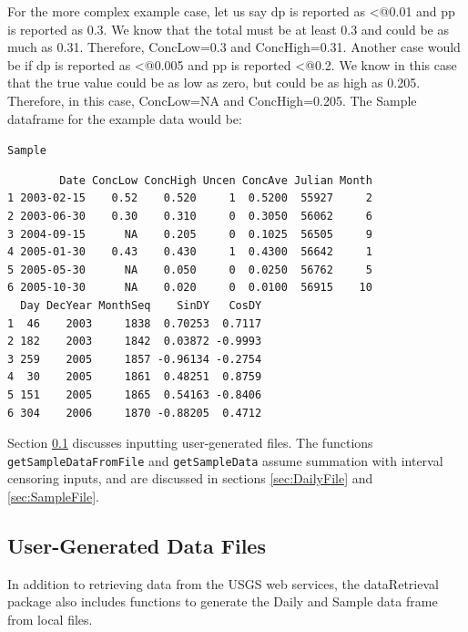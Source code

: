 \documentclass[a4paper,11pt]{article}\usepackage[]{graphicx}\usepackage[]{color}
\makeatletter
\newcommand{\hlstd}[1]{\textcolor[rgb]{0.345,0.345,0.345}{#1}}%
\newenvironment{kframe}{%
 \def\at@end@of@kframe{}%
 \ifinner\ifhmode%
  \def\at@end@of@kframe{\end{minipage}}%
  \begin{minipage}{\columnwidth}%
 \fi\fi%
 \def\FrameCommand##1{\hskip\@totalleftmargin \hskip-\fboxsep
 \colorbox{shadecolor}{##1}\hskip-\fboxsep
     \hskip-\linewidth \hskip-\@totalleftmargin \hskip\columnwidth}%
 \MakeFramed {\advance\hsize-\width
   \@totalleftmargin\z@ \linewidth\hsize
   \@setminipage}}%
 {\par\unskip\endMakeFramed%
 \at@end@of@kframe}
\newenvironment{knitrout}{}{} %
\makeatother
\begin{document}
For the more complex example case, let us say dp is reported as \verb@<@0.01 and pp is reported as 0.3. We know that the total must be at least 0.3 and could be as much as 0.31. Therefore, ConcLow=0.3 and ConcHigh=0.31. Another case would be if dp is reported as \verb@<@0.005 and pp is reported \verb@<@0.2. We know in this case that the true value could be as low as zero, but could be as high as 0.205. Therefore, in this case, ConcLow=NA and ConcHigh=0.205. The Sample dataframe for the example data would be:



\begin{knitrout}
\color{fgcolor}\begin{kframe}
\begin{alltt}
  \hlstd{Sample}
\end{alltt}
\begin{verbatim}
        Date ConcLow ConcHigh Uncen ConcAve Julian Month
1 2003-02-15    0.52    0.520     1  0.5200  55927     2
2 2003-06-30    0.30    0.310     0  0.3050  56062     6
3 2004-09-15      NA    0.205     0  0.1025  56505     9
4 2005-01-30    0.43    0.430     1  0.4300  56642     1
5 2005-05-30      NA    0.050     0  0.0250  56762     5
6 2005-10-30      NA    0.020     0  0.0100  56915    10
  Day DecYear MonthSeq    SinDY   CosDY
1  46    2003     1838  0.70253  0.7117
2 182    2003     1842  0.03872 -0.9993
3 259    2005     1857 -0.96134 -0.2754
4  30    2005     1861  0.48251  0.8759
5 151    2005     1865  0.54163 -0.8406
6 304    2006     1870 -0.88205  0.4712
\end{verbatim}
\end{kframe}
\end{knitrout}

Section \ref{sec:userFiles} discusses inputting user-generated files. The functions \texttt{getSampleDataFromFile} and \texttt{getSampleData} assume summation with interval censoring inputs, and are discussed in sections \ref{sec:DailyFile} and \ref{sec:SampleFile}.

\FloatBarrier

\subsection{User-Generated Data Files}
\label{sec:userFiles}
In addition to retrieving data from the USGS web services, the dataRetrieval package also includes functions to generate the Daily and Sample data frame from local files.
\end{document}

